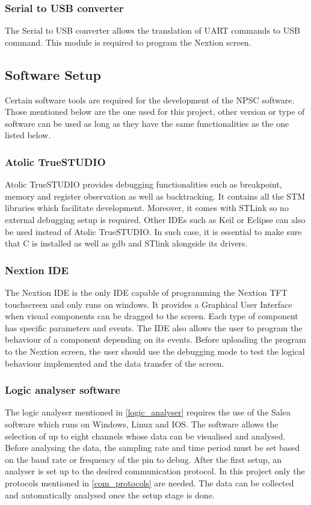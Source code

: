 \subsubsection{Serial to USB converter}
The Serial to USB converter allows the translation of UART commands to USB command. This module is required to program the Nextion screen.
 
\subsection{Software Setup}
Certain software tools are required for the development of the NPSC software. Those mentioned below are the one used for this project, other version or type of software can be used as long as they have the same functionalities as the one listed below.
\subsubsection{Atolic TrueSTUDIO}
Atolic TrueSTUDIO provides debugging functionalities such as breakpoint, memory and register observation as well as backtracking. It contains all the STM libraries which facilitate development. Moreover, it comes with STLink so no external debugging setup is required. Other IDEs such as Keil or Eclipse can also be used instead of Atolic TrueSTUDIO. In such case, it is essential to make sure that C is installed as well as gdb and STlink alongside its drivers. 
\subsubsection{Nextion IDE}
The Nextion IDE is the only IDE capable of programming the Nextion TFT touchscreen and only runs on windows. It provides a Graphical User Interface when visual components can be dragged to the screen. Each type of component has specific parameters and events. The IDE also allows the user to program the behaviour of a component depending on its events. Before uploading the program to the Nextion screen, the user should use the debugging mode to test the logical behaviour implemented and the data transfer of the screen.    
\subsubsection{Logic analyser software}
The logic analyser mentioned in \cref{logic_analyser} requires the use of the Salea software which runs on Windows, Linux and IOS. The software allows the selection of up to eight channels whose data can be visualised and analysed. Before analysing the data, the sampling rate and time period must be set based on the baud rate or frequency of the pin to debug. After the first setup, an analyser is set up to the desired communication protocol. In this project only the protocols mentioned in \cref{com_protocols} are needed. The data can be collected and automatically analysed once the setup stage is done.
